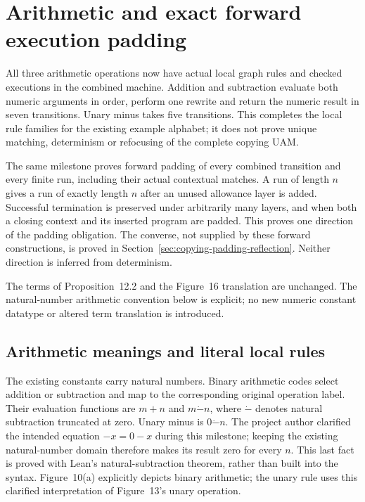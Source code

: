 \clearpage
\section{Arithmetic and exact forward execution padding}
\label{sec:copying-arithmetic-padding}
All three arithmetic operations now have actual local graph rules and checked
executions in the combined machine. Addition and subtraction evaluate both
numeric arguments in order, perform one rewrite and return the numeric result
in seven transitions. Unary minus takes five transitions. This completes the
local rule families for the existing example alphabet; it does not prove
unique matching, determinism or refocusing of the complete copying UAM.

The same milestone proves forward padding of every combined transition and
every finite run, including their actual contextual matches. A run of length
$n$ gives a run of exactly length $n$ after an unused allowance layer is added.
Successful termination is preserved under arbitrarily many layers, and when
both a closing context and its inserted program are padded. This proves one
direction of the padding obligation. The converse, not supplied by these
forward constructions, is proved in Section~\ref{sec:copying-padding-reflection}.
Neither direction is inferred from determinism.

The terms of Proposition~12.2 and the Figure~16 translation are unchanged.
The natural-number arithmetic convention below is explicit; no new numeric
constant datatype or altered term translation is introduced.

\subsection{Arithmetic meanings and literal local rules}

The existing constants carry natural numbers. Binary arithmetic codes select
addition or subtraction and map to the corresponding original operation label.
Their evaluation functions are $m+n$ and $m\mathbin{\dot{-}}n$, where
$\dot{-}$ denotes natural subtraction truncated at zero. Unary minus is
$0\mathbin{\dot{-}}n$. The project author clarified the intended equation
$-x=0-x$ during this milestone; keeping the existing natural-number domain
therefore makes its result zero for every $n$. This last fact is proved with
Lean's natural-subtraction theorem, rather than built into the syntax.
Figure~10(a) explicitly depicts binary arithmetic; the unary rule uses this
clarified interpretation of Figure~13's unary operation.

